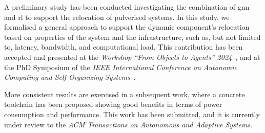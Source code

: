 \documentclass[runningheads]{llncs}
\begin{document}
A preliminary study has been conducted investigating the combination of \ac{gnn} and \ac{rl} to support the relocation of pulverised systems.
%
In this study,
we formalised a general approach to support the dynamic component's relocation based on properties of the system and the infrastructure,
such as, but not limited to,
latency,
bandwidth,
and computational load.
%
This contribution has been accepted and presented at the \emph{Workshop ``From Objects to Agents'' 2024}~\cite{DBLP:conf/woa/DominiFAV24},
and at the PhD Symposium of the \emph{IEEE International Conference on Autonomic Computing and Self-Organizing Systems}~\cite{DBLP:conf/acsos/Farabegoli24}.

More consistent results are exercised in a subsequent work,
where a concrete toolchain has been proposed showing good benefits in terms of power consumption and performance.
%
This work has been submitted,
and it is currently under review to the \emph{ACM Transactions on Autonomous and Adaptive Systems}.



\end{document}
